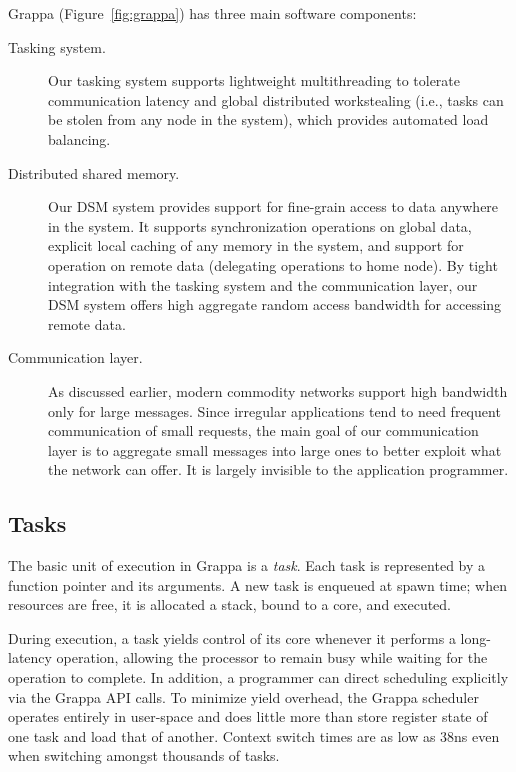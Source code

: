 Grappa (Figure~\ref{fig:grappa}) has three main software components: \begin{description}

\item [Tasking system.] Our tasking system supports lightweight multithreading to tolerate communication latency and global distributed workstealing (i.e., tasks can be stolen from any node in the system), which provides automated load balancing.

\item[Distributed shared memory.] Our DSM system provides support for fine-grain access to data anywhere in the system. It supports synchronization operations on global data, explicit local caching of any memory in the system, and support for operation on remote data (delegating operations to home node). By tight integration with the tasking system and the communication layer, our DSM system offers high aggregate random access bandwidth for accessing remote data.

\item[Communication layer.] As discussed earlier, modern commodity networks support high bandwidth only for large messages. Since irregular applications tend to need frequent communication of small requests, the main goal of our communication layer is to aggregate small messages into large ones to better exploit what the network can offer. It is largely invisible to the application programmer.

\end{description}

\subsection{Tasks}

The basic unit of execution in Grappa is a {\em task}. Each task is represented by a function pointer and its arguments. A new task is enqueued at spawn time; when resources are free, it is allocated a stack, bound to a core, and executed.

During execution, a task yields control of its core whenever it performs a long-latency operation, allowing the processor to remain busy while waiting for the operation to complete.  In addition,  a programmer can direct scheduling explicitly via the Grappa API calls. To minimize yield overhead, the Grappa scheduler operates entirely in user-space and does little more than store register state of one task and load that of another. Context switch times are as low as 38ns even when switching amongst thousands of tasks.

